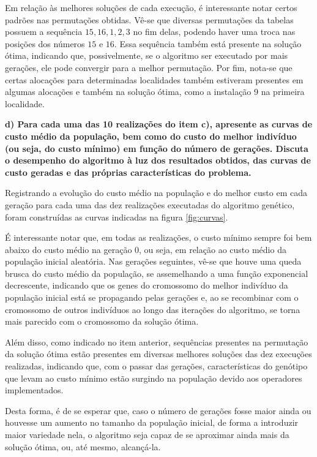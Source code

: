 \documentclass[a4paper, 12pt]{article}
\begin{document}
Em relação às melhores soluções de cada execução, é interessante notar certos padrões nas permutações obtidas. Vê-se que diversas permutações da tabelas possuem a sequência $15,16,1,2,3$ no fim delas, podendo haver uma troca nas posições dos números $15$ e $16$. Essa sequência também está presente na solução ótima, indicando que, possivelmente, se o algoritmo ser executado por mais gerações, ele pode convergir para a melhor permutação. Por fim, nota-se que certas alocações para determinadas localidades também estiveram presentes em algumas alocações e também na solução ótima, como a instalação 9 na primeira localidade.

\textbf{d) Para cada uma das 10 realizações do item c), apresente as curvas de custo médio da população, bem como do custo do melhor indivíduo (ou seja, do custo mínimo) em função do número de gerações. Discuta o desempenho do algoritmo à luz dos resultados obtidos, das curvas de custo geradas e das próprias características do problema.}

Registrando a evolução do custo médio na população e do melhor custo em cada geração para cada uma das dez realizações executadas do algoritmo genético, foram construídas as curvas indicadas na figura \ref{fig:curvas}.

É interessante notar que, em todas as realizações, o custo mínimo sempre foi bem abaixo do custo médio na geração 0, ou seja, em relação ao custo médio da população inicial aleatória. Nas gerações seguintes, vê-se que houve uma queda brusca do custo médio da população, se assemelhando a uma função exponencial decrescente, indicando que os genes do cromossomo do melhor indivíduo da população inicial está se propagando pelas gerações e, ao se recombinar com o cromossomo de outros indivíduos ao longo das iterações do algoritmo, se torna mais parecido com o cromossomo da solução ótima. 

Além disso, como indicado no item anterior, sequências presentes na permutação da solução ótima estão presentes em diversas melhores soluções das dez execuções realizadas, indicando que, com o passar das gerações, características do genótipo que levam ao custo mínimo estão surgindo na população devido aos operadores implementados.

Desta forma, é de se esperar que, caso o número de gerações fosse maior ainda ou houvesse um aumento no tamanho da população inicial, de forma a introduzir maior variedade nela, o algoritmo seja capaz de se aproximar ainda mais da solução ótima, ou, até mesmo, alcançá-la. 
\end{document}
